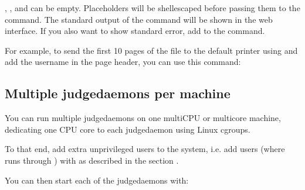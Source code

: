 \documentclass[a4paper,10pt,english,openany]{sphinxmanual}
\begin{document}
\sphinxAtStartPar
\sphinxcode{\sphinxupquote{{[}language{]}}}, \sphinxcode{\sphinxupquote{{[}teamname{]}}}, \sphinxcode{\sphinxupquote{{[}teamid{]}}} and
\sphinxcode{\sphinxupquote{{[}location{]}}} can be empty. Placeholders will be shell\sphinxhyphen{}escaped before
passing them to the command. The standard output of the command will
be shown in the web interface. If you also want to show standard error,
add  to the command.

\sphinxAtStartPar
For example, to send the first 10 pages of the file to the default printer
using  and add the username in the page header,
you can use this command:

\begin{sphinxVerbatim}[commandchars=\\\{\}]
  \PYG{p}{[}\PYG{p}{]}     \PYG{p}{[}\PYG{p}{]} 
\end{sphinxVerbatim}


\subsection{Multiple judgedaemons per machine}
\label{\detokenize{config-advanced:multiple-judgedaemons-per-machine}}\label{\detokenize{config-advanced:multiple-judgedaemons}}
\sphinxAtStartPar
You can run multiple judgedaemons on one multi\sphinxhyphen{}CPU or multi\sphinxhyphen{}core
machine, dedicating one CPU core to each judgedaemon using Linux
cgroups.

\sphinxAtStartPar
To that end, add extra unprivileged users to the system, i.e. add users
 (where  runs through ) with
 as described in the section {\hyperref[\detokenize{install-judgehost:installing-judgehost}]{}}.

\sphinxAtStartPar
You can then start each of the judgedaemons with:

\begin{sphinxVerbatim}[commandchars=\\\{\}]
  
\end{sphinxVerbatim}
\end{document}
